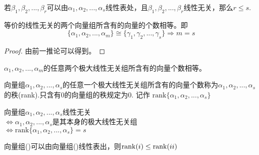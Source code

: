 \documentclass[blue,normal,cn]{elegantnote}
\begin{document}
\begin{lemma} 
    \label{1}
    若$β_1,β_2,...,β_r$可以由$α_1,α_2,...,α_s$线性表处，且$β_1,β_2,...,β_r$线性无关，那么$r≤s$.
\end{lemma}

\begin{corollary}
   等价的线性无关的两个向量组所含有的向量的个数相等。即
   \begin{equation*}
    \{α_1,α_2,...,α_m\} \cong \{γ_1,γ_2,...,γ_s\} \Rightarrow m=s
   \end{equation*}
\end{corollary}

\begin{proof}
    由前一推论可以得到。
\end{proof}


\begin{corollary}
    $α_1,α_2,...,α_m$的任意两个极大线性无关组所含有的向量个数相等。
 \end{corollary}

\begin{definition}
    向量组$α_1,α_2,...,α_s$的任意一个极大线性无关组所含有的向量个数称为$α_1,α_2,...,α_s$的秩(rank).只含有0的向量组的秩规定为0.
    记作 $\mathrm{rank}\{α_1,α_2,...,α_s\}$
\end{definition}

\begin{proposition}
向量组$α_1,α_2,...,α_s$线性无关 \\
$\Leftrightarrow α_1,α_2,...,α_s$是其本身的极大线性无关组\\
$\Leftrightarrow \mathrm{rank}\{α_1,α_2,...,α_s\}=s$
\end{proposition}

\begin{proposition}
    向量组(\uppercase\expandafter{})可以由向量组(\uppercase\expandafter{})线性表出，则$\mathrm{rank}(\uppercase\expandafter{\romannumeral1}) \leq \mathrm{rank}(\uppercase\expandafter{\romannumeral2})$
\end{proposition}
\end{document}
